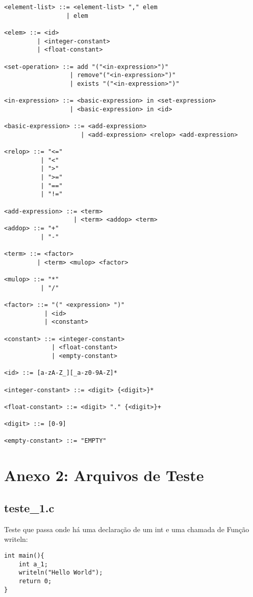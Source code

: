 \documentclass[runningheads]{llncs}
\begin{document}
\begin{sizepar}{8}{10}
\begin{verbatim}
<element-list> ::= <element-list> "," elem 
                 | elem

<elem> ::= <id> 
         | <integer-constant> 
         | <float-constant>

<set-operation> ::= add "("<in-expression>")"
                  | remove"("<in-expression>")"
                  | exists "("<in-expression>")"

<in-expression> ::= <basic-expression> in <set-expression>
                  | <basic-expression> in <id>

<basic-expression> ::= <add-expression> 
                     | <add-expression> <relop> <add-expression>

<relop> ::= "<=" 
          | "<" 
          | ">"
          | ">="
          | "=="
          | "!="

<add-expression> ::= <term>
                   | <term> <addop> <term>
<addop> ::= "+"
          | "-"

<term> ::= <factor>
         | <term> <mulop> <factor>

<mulop> ::= "*"
          | "/"

<factor> ::= "(" <expression> ")" 
           | <id> 
           | <constant>

<constant> ::= <integer-constant>
             | <float-constant>
             | <empty-constant>

<id> ::= [a-zA-Z_][_a-z0-9A-Z]*

<integer-constant> ::= <digit> {<digit>}*

<float-constant> ::= <digit> "." {<digit>}+

<digit> ::= [0-9]

<empty-constant> ::= "EMPTY"

\end{verbatim}
\end{sizepar}

\newpage
\section{Anexo 2: Arquivos de Teste}
\label{section:anx2}

\subsection{teste\_1.c}
Teste que passa onde há uma declaração de um int e uma chamada de Função writeln:
\begin{lstlisting}[style=CStyle]
int main(){
    int a_1;
    writeln("Hello World");
    return 0;
}\end{lstlisting}
\end{document}
